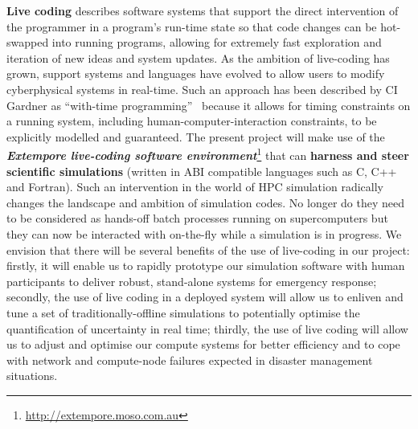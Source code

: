 {\bf Live coding} describes software systems that support the direct
intervention of the programmer in a program’s run-time state so that 
code changes can be 
hot-swapped into running programs, allowing for extremely fast
exploration and iteration of new ideas and system updates. As the
ambition of live-coding has grown, support systems and languages have
evolved to allow users to modify 
cyberphysical systems in real-time. Such an approach has been
described by CI Gardner as ``with-time
programming''~\parencite{sorensen2010programming} because it allows
for timing constraints on a running system, including
human-computer-interaction constraints, to be explicitly modelled and
guaranteed. The present project will make use of the {\em\bf Extempore
  live-coding software
  environment}\footnote{\url{http://extempore.moso.com.au}} that can
{\bf harness and steer scientific simulations} (written in ABI compatible
languages such as C, C++ and Fortran). Such an intervention in
the world of HPC simulation radically changes
the landscape and ambition of simulation codes. No longer do they need
to be considered as hands-off batch processes running on
supercomputers but they can now be interacted with on-the-fly while a
simulation is in progress. We envision that there will be several
benefits of the use of live-coding in our project: firstly, it
will enable us to {rapidly prototype our simulation software}  with human participants to
deliver robust, stand-alone systems for
 emergency response;  secondly, the use of live coding in a deployed system will allow us to 
{enliven and tune a set of traditionally-offline simulations to potentially optimise the 
quantification of uncertainty in real time}; thirdly, the use of live coding
will allow us to {adjust and optimise our compute systems for better efficiency} and to cope 
with network and compute-node failures expected in disaster management situations.

\iffalse
Computational decision support systems for disaster management have
existed for many decades \parencite{wallaceDecision1985}, and
advances have been made both in incorporating
uncertainty \parencite{thompsonSocial2014,nealeNavigating2015}
and providing real-time interaction and
output~\parencite{yuSupport2006}. More recently, mixed-reality game
scenarios have been used to understand and optimise human-agent
collaboration for disaster response~\parencite{ramchurn2016human}. In
our project plan we will follow a similar approach and will employ
mock-game scenarios to examine and understand the nature of decision
making with expert modelling support. In a novel twist, we will run
these games together with live-coding optimisation and tuning of the
software system and the underlying computational platform. By
analysing the protocols of these live optimisations, we will
accumulate data to feed into redesign of the software interface and to
understand the time requirements and controls needed for the
computational platform.
\fi


